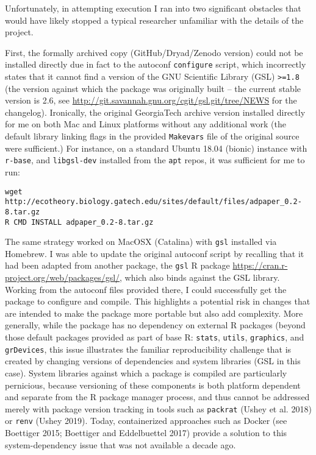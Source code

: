\documentclass[
]{rescience}
\begin{document}
Unfortunately, in attempting execution I ran into two significant
obstacles that would have likely stopped a typical researcher unfamiliar
with the details of the project.

First, the formally archived copy (GitHub/Dryad/Zenodo version) could
not be installed directly due in fact to the autoconf \texttt{configure}
script, which incorrectly states that it cannot find a version of the
GNU Scientific Library (GSL) \texttt{\textgreater{}=1.8} (the version
against which the package was originally built -- the current stable
version is 2.6, see
\url{http://git.savannah.gnu.org/cgit/gsl.git/tree/NEWS} for the
changelog). Ironically, the original GeorgiaTech archive version
installed directly for me on both Mac and Linux platforms without any
additional work (the default library linking flags in the provided
\texttt{Makevars} file of the original source were sufficient.) For
instance, on a standard Ubuntu 18.04 (bionic) instance with
\texttt{r-base}, and \texttt{libgsl-dev} installed from the \texttt{apt}
repos, it was sufficient for me to run:

\begin{verbatim}
wget http://ecotheory.biology.gatech.edu/sites/default/files/adpaper_0.2-8.tar.gz
R CMD INSTALL adpaper_0.2-8.tar.gz
\end{verbatim}

The same strategy worked on MacOSX (Catalina) with \texttt{gsl} installed
via Homebrew. I was able to update the original autoconf script by
recalling that it had been adapted from another package, the
\texttt{gsl} R package
\url{https://cran.r-project.org/web/packages/gsl/}, which also binds
against the GSL library. Working from the autoconf files provided there,
I could successfully get the package to configure and compile. This
highlights a potential risk in changes that are intended to make the
package more portable but also add complexity. More generally, while the
package has no dependency on external R packages (beyond those default
packages provided as part of base R: \texttt{stats}, \texttt{utils},
\texttt{graphics}, and \texttt{grDevices}, this issue illustrates the
familiar reproducibility challenge that is created by changing versions
of dependencies and system libraries (GSL in this case). System
libraries against which a package is compiled are particularly
pernicious, because versioning of these components is both platform
dependent and separate from the R package manager process, and thus
cannot be addressed merely with package version tracking in tools such
as \texttt{packrat} (Ushey et al. 2018) or \texttt{renv} (Ushey 2019).
Today, containerized approaches such as Docker (see Boettiger 2015;
Boettiger and Eddelbuettel 2017) provide a solution to this
system-dependency issue that was not available a decade ago.
\end{document}
